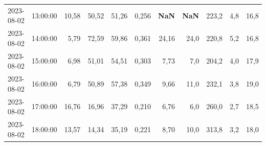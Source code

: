 \documentclass[]{VUMIFTemplateClass}
\begin{document}
\begin{table}[H]
{\begin{tabular}{|l|c|r|r|r|r|r|r|r|r|r|}
                2023-08-02    & 13:00:00        & 10,58            & 50,52            & 51,26             & 0,256            & \textbf{NaN}          & \textbf{NaN}           & 223,2                & 4,8                  & 16,8           \\
                2023-08-02    & 14:00:00        & 5,79             & 72,59            & 59,86             & 0,361            & 24,16                 & 24,0                   & 220,8                & 5,2                  & 16,8           \\
                2023-08-02    & 15:00:00        & 6,98             & 51,01            & 54,51             & 0,303            & 7,73                  & 7,0                    & 204,2                & 4,0                  & 17,9           \\
                2023-08-02    & 16:00:00        & 6,79             & 50,89            & 57,38             & 0,349            & 9,66                  & 11,0                   & 232,1                & 3,8                  & 19,0           \\
                2023-08-02    & 17:00:00        & 16,76            & 16,96            & 37,29             & 0,210            & 6,76                  & 6,0                    & 260,0                & 2,7                  & 18,5           \\
                2023-08-02    & 18:00:00        & 13,57            & 14,34            & 35,19             & 0,221            & 8,70                  & 10,0                   & 313,8                & 3,2                  & 18,0           \\
                \hline
            \end{tabular}
        }
        \label{tab:missing_data}
    \end{table}
\end{document}
